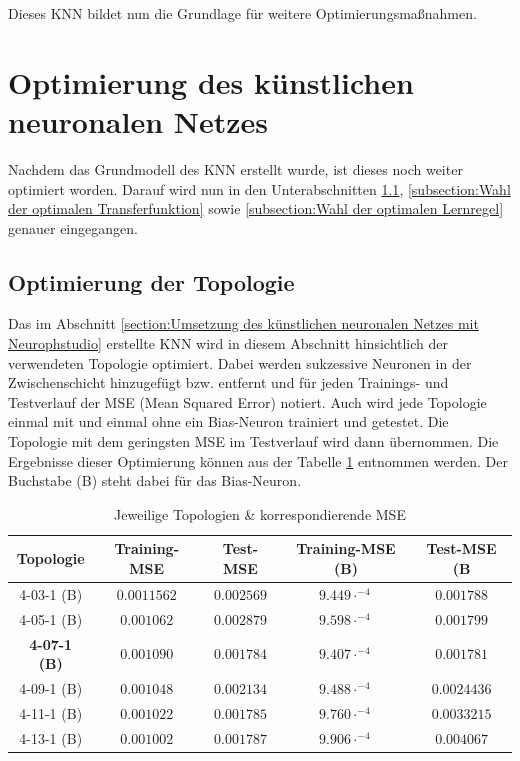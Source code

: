 Dieses KNN bildet nun die Grundlage für weitere Optimierungsmaßnahmen.

\section{Optimierung des künstlichen neuronalen Netzes}
\label{section:Optimierung des künstlischen neuronalen Netzes}

Nachdem das Grundmodell des KNN erstellt wurde, ist dieses noch weiter optimiert worden. Darauf wird nun in den Unterabschnitten \ref{subsection:Optimierung der Topologie}, \ref{subsection:Wahl der optimalen Transferfunktion} sowie \ref{subsection:Wahl der optimalen Lernregel} genauer eingegangen. 

\subsection{Optimierung der Topologie}
\label{subsection:Optimierung der Topologie}

Das im Abschnitt \ref{section:Umsetzung des künstlichen neuronalen Netzes mit Neurophstudio} erstellte KNN wird in diesem Abschnitt hinsichtlich der verwendeten Topologie optimiert. Dabei werden sukzessive Neuronen in der Zwischenschicht hinzugefügt bzw. entfernt und für jeden Trainings- und Testverlauf der MSE (Mean Squared Error) notiert. Auch wird jede Topologie einmal mit und einmal ohne ein Bias-Neuron trainiert und getestet. Die Topologie mit dem geringsten MSE im Testverlauf wird dann übernommen. Die Ergebnisse dieser Optimierung können aus der Tabelle \ref{tab:TOPMSE} entnommen werden. Der Buchstabe (B) steht dabei für das Bias-Neuron.

\begin{table}[H]
  \centering
  \begin{tabular}{|c|c|c|c|c|}
  \hline 
  \rule[0ex]{0pt}{2.5ex} \textbf{Topologie}& \textbf{Training-MSE} & \textbf{Test-MSE} & \textbf{Training-MSE (B)} & \textbf{Test-MSE (B}\\ 
  \hline 
  \rule[0ex]{0pt}{2.5ex} 4-03-1 (B)& $0.0011562$& $0.002569$ & $9.449 \cdot^{-4}$ & $0.001788$\\ 
  \hline 
  \rule[0ex]{0pt}{2.5ex} 4-05-1 (B)& $0.001062$ & $0.002879$ & $9.598 \cdot^{-4}$ & $0.001799$\\ 
  \hline 
  \rule[0ex]{0pt}{2.5ex} \textbf{4-07-1 (B)}& $0.001090$ & $0.001784$ & $9.407\cdot^{-4}$ & $0.001781$\\ 
  \hline 
  \rule[0ex]{0pt}{2.5ex} 4-09-1 (B)& $0.001048$ & $0.002134$ & $9.488\cdot^{-4}$ & $0.0024436$\\ 
  \hline 
  \rule[0ex]{0pt}{2.5ex} 4-11-1 (B)& $0.001022$ & $0.001785$ & $9.760\cdot^{-4}$ & $0.0033215$\\ 
  \hline 
  \rule[0ex]{0pt}{2.5ex} 4-13-1 (B)& $0.001002$ & $0.001787$ & $9.906\cdot^{-4}$ & $0.004067$\\ 
  \hline 
  \end{tabular} 
  \caption{Jeweilige Topologien \& korrespondierende MSE}
  \label{tab:TOPMSE}
\end{table}

